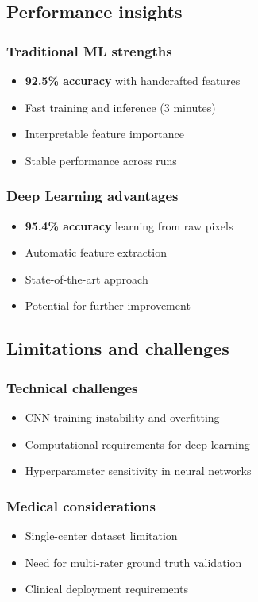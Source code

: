 \documentclass[11pt]{article}
\begin{document}
\subsection{Performance insights}

\subsubsection{Traditional ML strengths}
\begin{itemize}
    \item \textbf{92.5\% accuracy} with handcrafted features
    \item Fast training and inference (3 minutes)
    \item Interpretable feature importance
    \item Stable performance across runs
\end{itemize}

\subsubsection{Deep Learning advantages}
\begin{itemize}
    \item \textbf{95.4\% accuracy} learning from raw pixels
    \item Automatic feature extraction
    \item State-of-the-art approach
    \item Potential for further improvement
\end{itemize}

\subsection{Limitations and challenges}

\subsubsection{Technical challenges}
\begin{itemize}
    \item CNN training instability and overfitting
    \item Computational requirements for deep learning
    \item Hyperparameter sensitivity in neural networks
\end{itemize}

\subsubsection{Medical considerations}
\begin{itemize}
    \item Single-center dataset limitation
    \item Need for multi-rater ground truth validation
    \item Clinical deployment requirements
\end{itemize}
\end{document}
